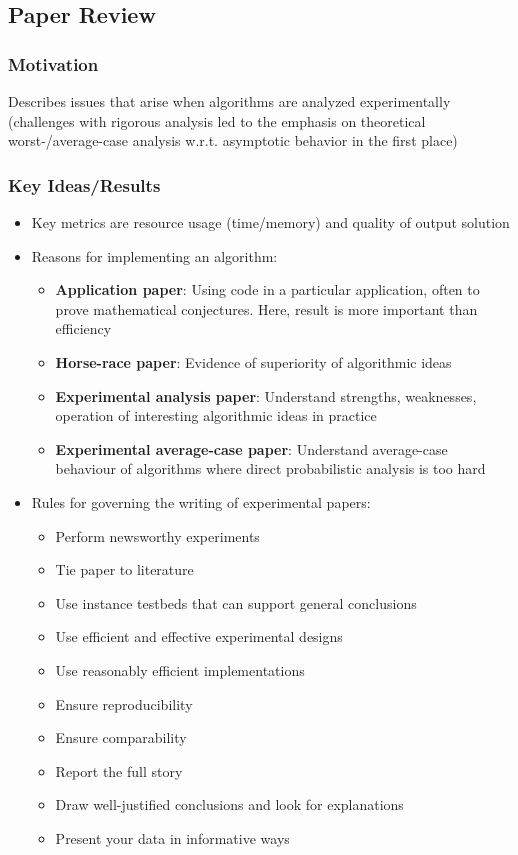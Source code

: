 \subsection{Paper Review}

\subsubsection{Motivation}

Describes issues that arise when algorithms are analyzed experimentally (challenges with rigorous analysis led to the emphasis on theoretical worst-/average-case analysis w.r.t. asymptotic behavior in the first place)

\subsubsection{Key Ideas/Results}

\begin{itemize}
    \item Key metrics are resource usage (time/memory) and quality of output solution
    \item Reasons for implementing an algorithm:
    \begin{itemize}
        \item \textbf{Application paper}: Using code in a particular application, often to prove mathematical conjectures. Here, result is more important than efficiency
        \item \textbf{Horse-race paper}: Evidence of superiority of algorithmic ideas
        \item \textbf{Experimental analysis paper}: Understand strengths, weaknesses, operation of interesting algorithmic ideas in practice
        \item \textbf{Experimental average-case paper}: Understand average-case behaviour of algorithms where direct probabilistic analysis is too hard
    \end{itemize}
    \item Rules for governing the writing of experimental papers:
    \begin{itemize}
        \item Perform newsworthy experiments
        \item Tie paper to literature
        \item Use instance testbeds that can support general conclusions
        \item Use efficient and effective experimental designs
        \item Use reasonably efficient implementations
        \item Ensure reproducibility
        \item Ensure comparability
        \item Report the full story
        \item Draw well-justified conclusions and look for explanations
        \item Present your data in informative ways
    \end{itemize}
\end{itemize}

